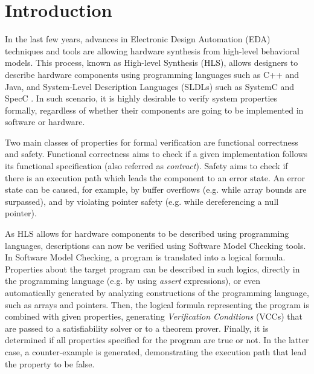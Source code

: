 \documentclass{sig-alternate}
\begin{document}



\section{Introduction} \label{intro}

In the last few years, advances in Electronic Design Automation (EDA)
techniques and tools are allowing hardware synthesis from high-level
behavioral models.  This process, known as High-level Synthesis (HLS),
allows designers to describe hardware components using programming
languages such as C++ and Java, and System-Level Description Languages
(SLDLs) such as SystemC and SpecC \cite{Gerstlauer:2009}.  In such
scenario, it is highly desirable to verify system properties formally,
regardless of whether their components are going to be implemented in
software or hardware.

Two main classes of properties for formal verification are functional
correctness and safety.  Functional correctness aims to check if a given
implementation follows its functional specification (also referred as
\emph{contract}).  Safety aims to check if there is an execution path
which leads the component to an error state.  An error state can be
caused, for example, by buffer overflows (e.g. while array bounds are
surpassed), and by violating pointer safety (e.g. while dereferencing a
null pointer).

As HLS allows for hardware components to be described using programming
languages, descriptions can now be verified using Software Model
Checking tools.  In Software Model Checking, a program is translated
into a logical formula.  Properties about the target program can be
described in such logics, directly in the programming language (e.g. by
using \emph{assert} expressions), or even automatically generated by
analyzing constructions of the programming language, such as arrays and
pointers.  Then, the logical formula representing the program is
combined with given properties, generating \emph{Verification
  Conditions} (VCCs) that are passed to a satisfiability solver or to a
theorem prover.  Finally, it is determined if all properties specified
for the program are true or not.  In the latter case, a counter-example
is generated, demonstrating the execution path that lead the property to
be false.
\end{document}
